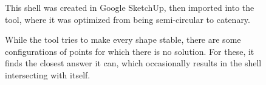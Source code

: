 \documentclass{thesis}
\begin{document}
\begin{figure}
\caption[A loaded mesh]{This shell was created in Google SketchUp, then imported into the tool, where it was optimized
from being semi-circular to catenary.}
\label{fig:triangle_mesh}
\end{figure}

\begin{figure}
\caption[Results of user error]{While the tool tries to make every shape stable, there are some configurations of points
for which there is no solution.  For these, it finds the closest answer it can, which occasionally results in the shell
intersecting with itself.}
\label{fig:highly_improbably}
\end{figure}
\end{document}
